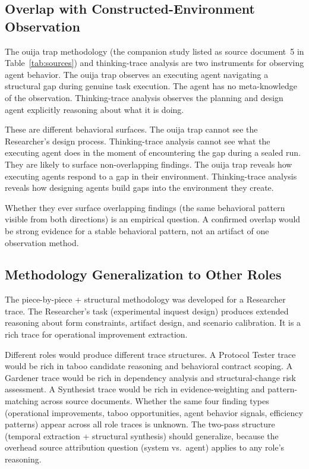 \documentclass[11pt,a4paper]{article}
\begin{document}
\subsection{Overlap with Constructed-Environment Observation}

The ouija trap methodology (the companion study listed as source document~5
in Table~\ref{tab:sources})
and thinking-trace analysis are two instruments for observing agent behavior.
The ouija trap observes an executing agent navigating a structural gap during
genuine task execution. The agent has no meta-knowledge of the observation.
Thinking-trace analysis observes the planning and design agent explicitly
reasoning about what it is doing.

These are different behavioral surfaces. The ouija trap cannot see the
Researcher's design process. Thinking-trace analysis cannot see what the
executing agent does in the moment of encountering the gap during a sealed run.
They are likely to surface non-overlapping findings. The ouija trap reveals how
executing agents respond to a gap in their environment. Thinking-trace analysis
reveals how designing agents build gaps into the environment they create.

Whether they ever surface overlapping findings (the same behavioral pattern
visible from both directions) is an empirical question. A confirmed overlap
would be strong evidence for a stable behavioral pattern, not an artifact of
one observation method.

\subsection{Methodology Generalization to Other Roles}

The piece-by-piece + structural methodology was developed for a Researcher
trace. The Researcher's task (experimental inquest design) produces extended
reasoning about form constraints, artifact design, and scenario calibration. It
is a rich trace for operational improvement extraction.

Different roles would produce different trace structures. A Protocol Tester
trace would be rich in taboo candidate reasoning and behavioral contract
scoping. A Gardener trace would be rich in dependency analysis and
structural-change risk assessment. A Synthesist trace would be rich in
evidence-weighting and pattern-matching across source documents. Whether the
same four finding types (operational improvements, taboo opportunities, agent
behavior signals, efficiency patterns) appear across all role traces is
unknown. The two-pass structure (temporal extraction + structural synthesis)
should generalize, because the overhead source attribution question (system
vs.\ agent) applies to any role's reasoning.
\end{document}
